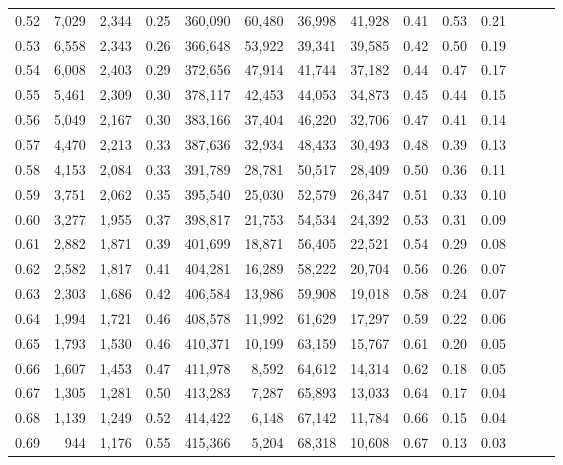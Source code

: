 \begin{tabular}{rrrrrrrrrrrrrr}
0.52 &   7,029 &  2,344 &  0.25 &  360,090 &   60,480 &  36,998 &  41,928 &  0.41 &  0.53 &      0.21 \\
0.53 &   6,558 &  2,343 &  0.26 &  366,648 &   53,922 &  39,341 &  39,585 &  0.42 &  0.50 &      0.19 \\
0.54 &   6,008 &  2,403 &  0.29 &  372,656 &   47,914 &  41,744 &  37,182 &  0.44 &  0.47 &      0.17 \\
0.55 &   5,461 &  2,309 &  0.30 &  378,117 &   42,453 &  44,053 &  34,873 &  0.45 &  0.44 &      0.15 \\
0.56 &   5,049 &  2,167 &  0.30 &  383,166 &   37,404 &  46,220 &  32,706 &  0.47 &  0.41 &      0.14 \\
0.57 &   4,470 &  2,213 &  0.33 &  387,636 &   32,934 &  48,433 &  30,493 &  0.48 &  0.39 &      0.13 \\
0.58 &   4,153 &  2,084 &  0.33 &  391,789 &   28,781 &  50,517 &  28,409 &  0.50 &  0.36 &      0.11 \\
0.59 &   3,751 &  2,062 &  0.35 &  395,540 &   25,030 &  52,579 &  26,347 &  0.51 &  0.33 &      0.10 \\
0.60 &   3,277 &  1,955 &  0.37 &  398,817 &   21,753 &  54,534 &  24,392 &  0.53 &  0.31 &      0.09 \\
0.61 &   2,882 &  1,871 &  0.39 &  401,699 &   18,871 &  56,405 &  22,521 &  0.54 &  0.29 &      0.08 \\
0.62 &   2,582 &  1,817 &  0.41 &  404,281 &   16,289 &  58,222 &  20,704 &  0.56 &  0.26 &      0.07 \\
0.63 &   2,303 &  1,686 &  0.42 &  406,584 &   13,986 &  59,908 &  19,018 &  0.58 &  0.24 &      0.07 \\
0.64 &   1,994 &  1,721 &  0.46 &  408,578 &   11,992 &  61,629 &  17,297 &  0.59 &  0.22 &      0.06 \\
0.65 &   1,793 &  1,530 &  0.46 &  410,371 &   10,199 &  63,159 &  15,767 &  0.61 &  0.20 &      0.05 \\
0.66 &   1,607 &  1,453 &  0.47 &  411,978 &    8,592 &  64,612 &  14,314 &  0.62 &  0.18 &      0.05 \\
0.67 &   1,305 &  1,281 &  0.50 &  413,283 &    7,287 &  65,893 &  13,033 &  0.64 &  0.17 &      0.04 \\
0.68 &   1,139 &  1,249 &  0.52 &  414,422 &    6,148 &  67,142 &  11,784 &  0.66 &  0.15 &      0.04 \\
0.69 &     944 &  1,176 &  0.55 &  415,366 &    5,204 &  68,318 &  10,608 &  0.67 &  0.13 &      0.03 \\

\end{tabular}
